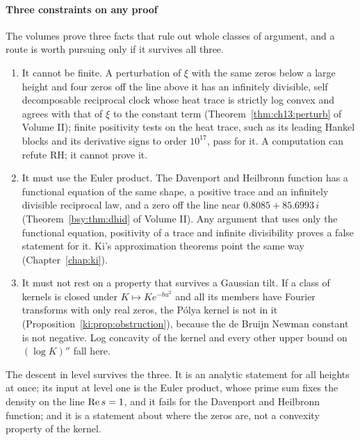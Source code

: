 \paragraph{Three constraints on any proof} The volumes prove three facts that rule out whole classes of argument, and a route is worth pursuing only if it survives all three.
\begin{enumerate}
\item It cannot be finite. A perturbation of $\xi$ with the same zeros below a large height and four zeros off the line above it has an infinitely divisible, self decomposable reciprocal clock whose heat trace is strictly log convex and agrees with that of $\xi$ to the constant term (Theorem~\ref{thm:ch13:perturb} of Volume II); finite positivity tests on the heat trace, such as its leading Hankel blocks and its derivative signs to order $10^{17}$, pass for it. A computation can refute RH; it cannot prove it.
\item It must use the Euler product. The Davenport and Heilbronn function has a functional equation of the same shape, a positive trace and an infinitely divisible reciprocal law, and a zero off the line near $0.8085+85.6993\,i$ (Theorem~\ref{bsy:thm:dhid} of Volume II). Any argument that uses only the functional equation, positivity of a trace and infinite divisibility proves a false statement for it. Ki's approximation theorems point the same way (Chapter~\ref{chap:ki}).
\item It must not rest on a property that survives a Gaussian tilt. If a class of kernels is closed under $K\mapsto Ke^{-bu^2}$ and all its members have Fourier transforms with only real zeros, the P\'olya kernel is not in it (Proposition~\ref{ki:prop:obstruction}), because the de Bruijn Newman constant is not negative. Log concavity of the kernel and every other upper bound on $(\log K)''$ fall here.
\end{enumerate}
The descent in level survives the three. It is an analytic statement for all heights at once; its input at level one is the Euler product, whose prime sum fixes the density on the line $\operatorname{Re} s=1$, and it fails for the Davenport and Heilbronn function; and it is a statement about where the zeros are, not a convexity property of the kernel.

